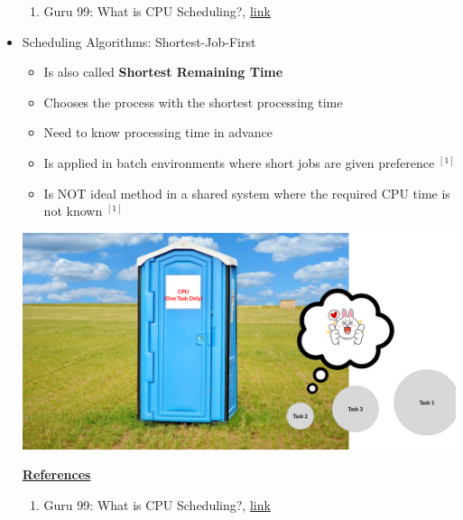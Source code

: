 \documentclass[12pt]{article}
\begin{document}
\begin{itemize}
    \begin{enumerate}[1)]
        \item Guru 99: What is CPU Scheduling?, \href{https://www.guru99.com/cpu-scheduling-algorithms.html#8}{link}
    \end{enumerate}

    \item Scheduling Algorithms: Shortest-Job-First
    \begin{itemize}
        \item Is also called \textbf{Shortest Remaining Time}
        \item Chooses the process with the shortest processing time
        \item Need to know processing time in advance
        \item Is applied in batch environments where short jobs are given preference $^{[1]}$
        \item Is NOT ideal method in a shared system where the required CPU time
        is not known $^{[1]}$
    \end{itemize}

    \bigskip

    \begin{center}
    \includegraphics[width=0.8\linewidth]{images/week_4_notes_1_2.png}
    \end{center}

    \underline{\textbf{References}}

    \begin{enumerate}[1)]
        \item Guru 99: What is CPU Scheduling?, \href{https://www.guru99.com/cpu-scheduling-algorithms.html#8}{link}
    \end{enumerate}


\end{itemize}
\end{document}
